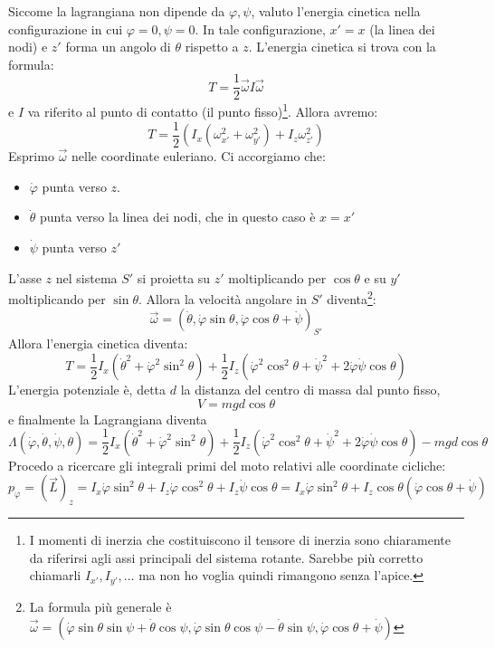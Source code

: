 \documentclass[a4paper,openany]{article}
\begin{document}
	Siccome la lagrangiana non dipende da $\varphi,\psi$, valuto l'energia cinetica nella configurazione in cui $\varphi=0, \psi=0$. In tale configurazione, $x' = x $ (la linea dei nodi) e $z'$ forma un angolo di $\theta$ rispetto a $z$. L'energia cinetica si trova con la formula:
	$$
	T =\dfrac{1}{2} \vec{\omega}I\vec{\omega}
	$$
	e $I$ va riferito al punto di contatto (il punto fisso)\footnote{I momenti di inerzia che costituiscono il tensore di inerzia sono chiaramente da riferirsi agli assi principali del sistema rotante. Sarebbe più corretto chiamarli $I_{x'}, I_{y'},...$ ma non ho voglia quindi rimangono senza l'apice.}. Allora avremo:
	$$
	T = \dfrac{1}{2}(I_x(\omega_{x'}^2+\omega^{2}_{y'})+I_z\omega^{2}_{z'})
	$$
	Esprimo $\vec{\omega}$ nelle coordinate euleriano. Ci accorgiamo che:
	\begin{itemize}
		\item $\dot{\varphi}$ punta verso $z$.
		\item $\dot{\theta}$ punta verso la linea dei nodi, che in questo caso è $x = x'$
		\item $\dot{\psi}$ punta verso $z'$
	\end{itemize}
	L'asse $z$ nel sistema $S'$ si proietta su $z'$ moltiplicando per $\cos\theta$ e su $y'$ moltiplicando per $\sin\theta$. Allora la velocità angolare in $S'$ diventa\footnote{La formula più generale è $\vec{\omega} = (\dot{\varphi}\sin\theta\sin\psi + \dot\theta\cos\psi, \dot{\varphi}\sin\theta\cos\psi - \dot{\theta}\sin\psi, \dot{\varphi}\cos\theta + \dot{\psi})$}:
	$$
	\vec{\omega} = (\dot{\theta},\dot{\varphi}\sin\theta, \dot{\varphi}\cos\theta + \dot{\psi})_{S'}
	$$
	Allora l'energia cinetica diventa:
	\begin{equation}\label{key}
		T = \dfrac{1}{2}I_x (\dot{\theta}^{2}+ \dot{\varphi}^2\sin^{2}\theta)+\dfrac{1}{2}I_z(\dot{\varphi}^{2}\cos^{2}\theta+\dot{\psi}^{2}+2\dot{\varphi}\dot{\psi}\cos\theta)
	\end{equation}
	L'energia potenziale è, detta $d$ la distanza del centro di massa dal punto fisso,
	$$
	V = mgd\cos\theta
	$$
	e finalmente la Lagrangiana diventa
	\begin{equation}\label{key}
		\Lambda(\dot{\varphi},\dot{\theta},\dot{\psi},\theta) = \dfrac{1}{2}I_x (\dot{\theta}^{2}+ \dot{\varphi}^2\sin^{2}\theta)+\dfrac{1}{2}I_z(\dot{\varphi}^{2}\cos^{2}\theta+\dot{\psi}^{2}+2\dot{\varphi}\dot{\psi}\cos\theta) - mgd\cos\theta
	\end{equation}
	Procedo a ricercare gli integrali primi del moto relativi alle coordinate cicliche:
	$$
	p_{\varphi} = (\vec{L})_{z} = I_x\dot{\varphi}\sin^2\theta + I_z\dot{\varphi}\cos^{2}\theta + I_z \dot{\psi}\cos\theta = I_x \dot{\varphi}\sin^2\theta + I_z \cos\theta(\dot{\varphi}\cos\theta+\dot{\psi})
	$$
\end{document}
